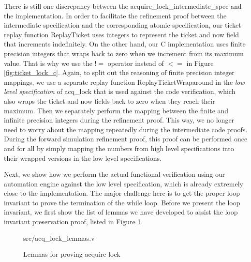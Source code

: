 There is still one discrepancy between the \textsf{acquire\_lock\_intermediate\_spec} and the
implementation. In order to facilitate the refinement proof between the intermediate specification
and the corresponding atomic specification, our ticket replay function \textsf{ReplayTicket}
uses integers to represent the \textsf{ticket} and \textsf{now} field that increments indefinitely.
On the other hand, our C implementation uses finite precision integers that wraps back to zero when
we increment from its maximum value. That is why we use the $!=$ operator instead
of $<=$ in Figure \ref{fig:ticket_lock_c}.
Again, to split out the reasoning of finite precision integer mappings, we use a separate
replay function \textsf{ReplayTicketWraparound} in the \textit{low level specification} of
\textsf{acq\_lock} that is used against the code verification, which also wraps the \textsf{ticket}
and \textsf{now} fields back to zero when they reach their maximum.
Then we separately perform the mapping between
the finite and infinite precision integers during the refinement proof. This way, we no longer
need to worry about the mapping repeatedly during the intermediate code proofs. During
the forward simulation refinement proof, this proof can be performed once and for all by
simply mapping the numbers from high level specifications into their wrapped versions
in the low level specifications.

Next, we show how we perform the actual functional verification using our automation engine
against the low level specification, which is already extremely close to the implementation.
The major challenge here is to get the proper loop invariant to prove the termination of the while
loop. Before we present the loop invariant, we first show the list of lemmas we have developed
to assist the loop invariant preservation proof, listed in Figure \ref{fig:acq_lock_lemmas_v}.

\begin{figure}
	 {src/acq_lock_lemmas.v}
	\caption{Lemmas for proving acquire lock}
	\label{fig:acq_lock_lemmas_v}
\end{figure}

